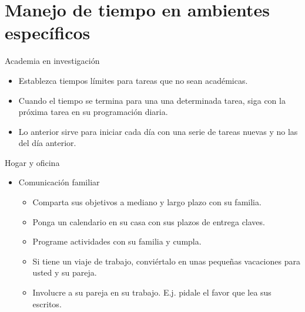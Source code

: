 \documentclass[
10pt,
aspectratio=169,
]{beamer}
\begin{document}
\section{Manejo de tiempo en ambientes espec\'ificos}
\begin{frame}[c]{Academia en investigaci\'on}
\begin{itemize}
\item Establezca tiempos l\'imites para tareas que no sean acad\'emicas.
\item Cuando el tiempo se termina para una una determinada tarea, siga con la pr\'oxima tarea en su programaci\'on diaria. 
\item Lo anterior sirve para iniciar cada d\'ia con una serie de tareas nuevas y no las del d\'ia anterior.
\end{itemize}
\end{frame}

\begin{frame}[c]{Hogar y oficina}
\begin{itemize}
\item \alert{Comunicaci\'on familiar}

\begin{itemize}
\item Comparta sus objetivos a mediano y largo plazo con su familia.
\item Ponga un calendario en su casa con sus plazos de entrega claves. 
\item Programe actividades con su familia y cumpla.
\item Si tiene un viaje de trabajo, conviértalo en unas peque\~nas vacaciones para usted y su pareja.
\item Involucre a su pareja en su trabajo. E.j. pidale el favor que lea sus escritos. 
\end{itemize}
\end{itemize}
\end{frame}
\end{document}
